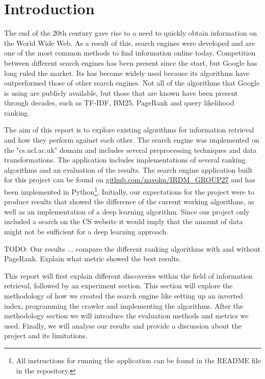 \section{Introduction}

The end of the 20th century gave rise to a need to quickly obtain information on the World Wide Web. As a result of this, search engines were developed and are one of the most common methods to find information online today. Competition between different search engines has been present since the start, but Google has long ruled the market. Its has become widely used because its algorithms have outperformed those of other search engines. Not all of the algorithms that Google is using are publicly available, but those that are known have been present through decades, such as TF-IDF, BM25, PageRank and query likelihood ranking.

The aim of this report is to explore existing algorithms for information retrieval and how they perform against each other. The search engine was implemented on the "cs.ucl.ac.uk" domain and includes several preprocessing techniques and data transformations. The application includes implementations of several ranking algorithms and an evaluation of the results. The search engine application built for this project can be found on \url{github.com/navohu/IRDM_GROUP27} and has been implemented in Python\footnote{All instructions for running the application can be found in the README file in the repository.}. Initially, our expectations for the project were to produce results that showed the difference of the current working algorithms, as well as an implementation of a deep learning algorithm. Since our project only included a search on the CS website it would imply that the amount of data might not be sufficient for a deep learning approach.



TODO: Our results ... compare the different ranking algorithms with and without PageRank. Explain what metric showed the best results.


This report will first explain different discoveries within the field of information retrieval, followed by an experiment section. This section will explore the methodology of how we created the search engine like setting up an inverted index, programming the crawler and implementing the algorithms. After the methodology section we will introduce the evaluation methods and metrics we used. Finally, we will analyse our results and provide a discussion about the project and its limitations.



